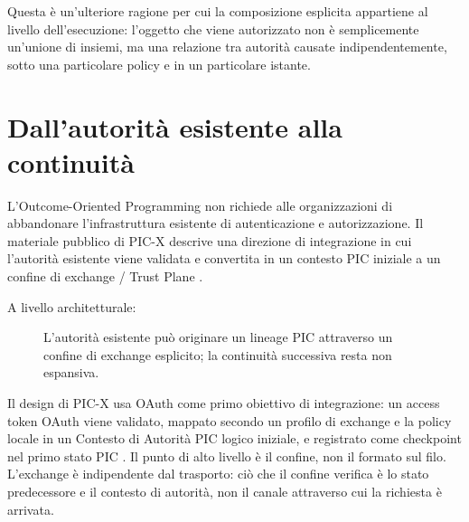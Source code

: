 \documentclass[10pt,oneside,openany]{book}
\begin{document}
Questa è un'ulteriore ragione per cui la composizione esplicita appartiene al livello dell'esecuzione: l'oggetto che viene autorizzato non è semplicemente un'unione di insiemi, ma una relazione tra autorità causate indipendentemente, sotto una particolare policy e in un particolare istante.

\chapter{Dall'autorità esistente alla continuità}

L'Outcome-Oriented Programming non richiede alle organizzazioni di abbandonare l'infrastruttura esistente di autenticazione e autorizzazione. Il materiale pubblico di PIC-X descrive una direzione di integrazione in cui l'autorità esistente viene validata e convertita in un contesto PIC iniziale a un confine di exchange / Trust Plane \cite{picxarch,picxinitial}.

A livello architetturale:

\begin{figure}[ht]
\centering
{}
\caption{L'autorità esistente può originare un lineage PIC attraverso un confine di exchange esplicito; la continuità successiva resta non espansiva.}
\end{figure}

Il design di PIC-X usa OAuth come primo obiettivo di integrazione: un access token OAuth viene validato, mappato secondo un profilo di exchange e la policy locale in un Contesto di Autorità PIC logico iniziale, e registrato come checkpoint nel primo stato PIC \cite{picxinitial}. Il punto di alto livello è il confine, non il formato sul filo. L'exchange è indipendente dal trasporto: ciò che il confine verifica è lo stato predecessore e il contesto di autorità, non il canale attraverso cui la richiesta è arrivata.
\end{document}

